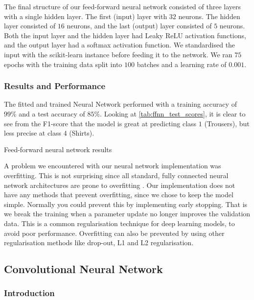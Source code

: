 \documentclass[../main.tex]{subfiles}
\begin{document}
The final structure of our feed-forward neural network consisted 
of three layers with a single hidden layer. The first (input) 
layer with $32$ neurons. The hidden layer consisted of $16$ 
neurons, and the last (output) layer consisted of $5$ neurons. 
Both the input layer and the hidden layer had Leaky ReLU 
activation functions, and the output layer had a softmax 
activation function.
We standardised the input with the scikit-learn 
 instance before feeding it to the 
network. We ran $75$ epochs with the training data split into 
$100$ batches and a learning rate of $0.001$.


\subsubsection{Results and Performance}

The fitted and trained Neural Network performed with a training 
accuracy of $99\%$ and a test accuracy of $85\%$.
Looking at \autoref{tab:ffnn_test_scores}, it is clear to see 
from the F1-score that the model is great at predicting class $1$ 
(Trousers), but less precise at class $4$ (Shirts). 

\begin{table}[H]
    \centering
    
    \caption{Feed-forward neural network results}
    \label{tab:ffnn_test_scores}
\end{table}
 
A problem we encountered with our neural network implementation 
was overfitting. This is not surprising since all standard, fully 
connected neural network architectures are prone to overfitting 
\autocite{prechelt_early_2012}. Our implementation does not have 
any methods that prevent overfitting, since we chose to keep the 
model simple. Normally you could prevent this by implementing 
early stopping. That is we break the training when a parameter 
update no longer improves the validation data. This is a common 
regularisation technique for deep learning models, to avoid poor 
performance. Overfitting can also be prevented by using other 
regularisation methods like drop-out, L1 and L2 regularisation. 


\subsection{Convolutional Neural Network}

\subsubsection{Introduction}
\end{document}
